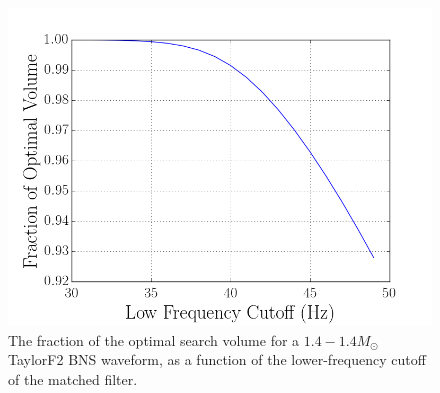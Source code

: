 


\begin{figure}
\centering
\includegraphics[width=1.0\textwidth]{papers/bns_o1_dev/figures/flow.png}
\caption{\label{fig:flow} 
The fraction of the optimal search volume for a $1.4-1.4 M_\odot$ TaylorF2 BNS waveform, as a function of the lower-frequency cutoff of the matched filter. 
}
\end{figure}


